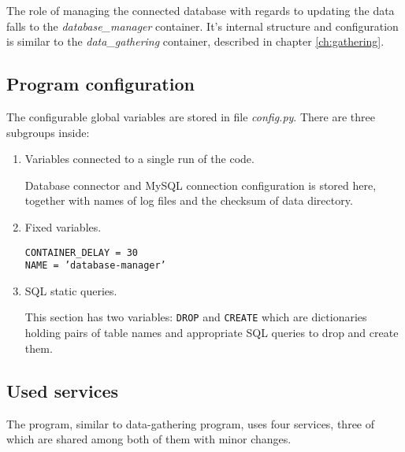 The role of managing the connected database with regards to updating the data falls to the \textit{database\_manager} container. It's internal structure and configuration is similar to the \textit{data\_gathering} container, described in chapter \ref{ch:gathering}.

\subsection{Program configuration}
The configurable global variables are stored in file \textit{config.py}. There are three subgroups inside:

\begin{enumerate}
    \item Variables connected to a single run of the code. \par
          Database connector and MySQL connection configuration is stored here, together with names of log files and the checksum of data directory.
    \item Fixed variables. \par
          \texttt{CONTAINER\_DELAY = 30 \\ NAME = 'database-manager'}
    \item SQL static queries. \par
          This section has two variables: \texttt{DROP} and \texttt{CREATE} which are dictionaries holding pairs of table names and appropriate SQL queries to drop and create them.
\end{enumerate}


\subsection{Used services}
The program, similar to data-gathering program, uses four services, three of which are shared among both of them with minor changes.

